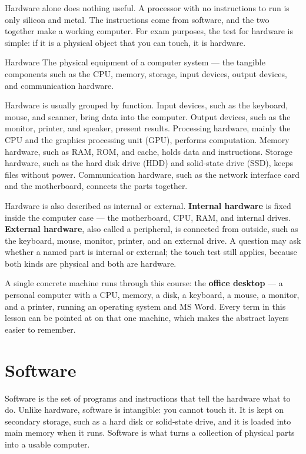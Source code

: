 Hardware alone does nothing useful. A processor with no instructions to run
is only silicon and metal. The instructions come from software, and the two
together make a working computer. For exam purposes, the test for hardware is
simple: if it is a physical object that you can touch, it is hardware.

\begin{definitionbox}{Hardware}
The physical equipment of a computer system --- the tangible components such
as the CPU, memory, storage, input devices, output devices, and communication
hardware.
\end{definitionbox}

Hardware is usually grouped by function. Input devices, such as the keyboard,
mouse, and scanner, bring data into the computer. Output devices, such as the
monitor, printer, and speaker, present results. Processing hardware, mainly
the CPU and the graphics processing unit (GPU), performs computation. Memory
hardware, such as RAM, ROM, and cache, holds data and instructions. Storage
hardware, such as the hard disk drive (HDD) and solid-state drive (SSD),
keeps files without power. Communication hardware, such as the network
interface card and the motherboard, connects the parts together.

Hardware is also described as internal or external. \textbf{Internal
hardware} is fixed inside the computer case --- the motherboard, CPU, RAM, and
internal drives. \textbf{External hardware}, also called a peripheral, is
connected from outside, such as the keyboard, mouse, monitor, printer, and an
external drive. A question may ask whether a named part is internal or
external; the touch test still applies, because both kinds are physical and
both are hardware.

A single concrete machine runs through this course: the \textbf{office
desktop} --- a personal computer with a CPU, memory, a disk, a keyboard, a
mouse, a monitor, and a printer, running an operating system and MS Word.
Every term in this lesson can be pointed at on that one machine, which makes
the abstract layers easier to remember.

\section{Software}
Software is the set of programs and instructions that tell the hardware what
to do. Unlike hardware, software is intangible: you cannot touch it. It is
kept on secondary storage, such as a hard disk or solid-state drive, and it
is loaded into main memory when it runs. Software is what turns a collection
of physical parts into a usable computer.

